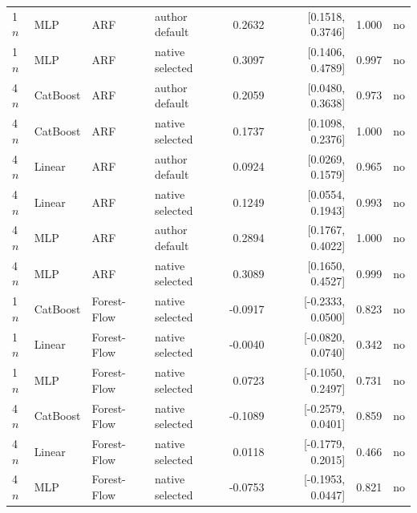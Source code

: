 \begin{longtable}{llllrrrl}
1$n$ & MLP & ARF & author default & 0.2632 & [0.1518, 0.3746] & 1.000 & no \\
1$n$ & MLP & ARF & native selected & 0.3097 & [0.1406, 0.4789] & 0.997 & no \\
4$n$ & CatBoost & ARF & author default & 0.2059 & [0.0480, 0.3638] & 0.973 & no \\
4$n$ & CatBoost & ARF & native selected & 0.1737 & [0.1098, 0.2376] & 1.000 & no \\
4$n$ & Linear & ARF & author default & 0.0924 & [0.0269, 0.1579] & 0.965 & no \\
4$n$ & Linear & ARF & native selected & 0.1249 & [0.0554, 0.1943] & 0.993 & no \\
4$n$ & MLP & ARF & author default & 0.2894 & [0.1767, 0.4022] & 1.000 & no \\
4$n$ & MLP & ARF & native selected & 0.3089 & [0.1650, 0.4527] & 0.999 & no \\
1$n$ & CatBoost & Forest-Flow & native selected & -0.0917 & [-0.2333, 0.0500] & 0.823 & no \\
1$n$ & Linear & Forest-Flow & native selected & -0.0040 & [-0.0820, 0.0740] & 0.342 & no \\
1$n$ & MLP & Forest-Flow & native selected & 0.0723 & [-0.1050, 0.2497] & 0.731 & no \\
4$n$ & CatBoost & Forest-Flow & native selected & -0.1089 & [-0.2579, 0.0401] & 0.859 & no \\
4$n$ & Linear & Forest-Flow & native selected & 0.0118 & [-0.1779, 0.2015] & 0.466 & no \\
4$n$ & MLP & Forest-Flow & native selected & -0.0753 & [-0.1953, 0.0447] & 0.821 & no \\
\bottomrule
\end{longtable}
